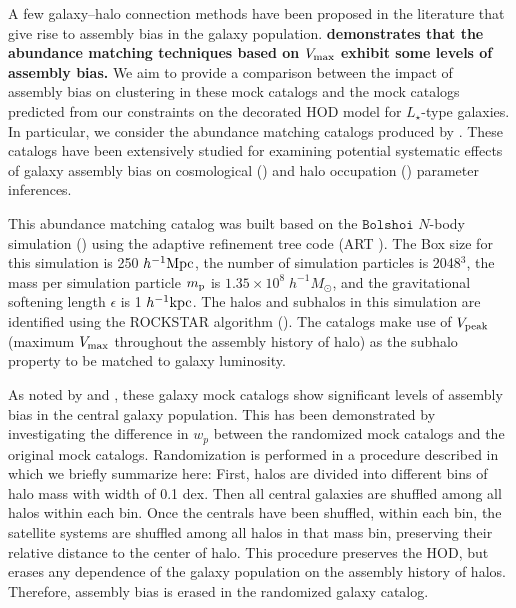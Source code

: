 \documentclass[twocolumn]{aastex61}
\begin{document}
A few galaxy--halo connection methods have been proposed in the literature that give rise to assembly bias in the galaxy population. 
{\bf \color{dred} 
    \citet{arz2014} demonstrates that the abundance matching techniques based on $V_{\rm max }$ 
    \citep{conroy:2006aa,hw2013,reddick2013} exhibit some levels of assembly bias. 
}
We aim to provide a comparison between the impact of assembly bias on clustering in these mock catalogs and the mock catalogs predicted from our constraints on the decorated HOD model for $L_{\star}$-type galaxies. In particular, we consider the abundance matching catalogs produced by \citet{hw2013}. These catalogs have been extensively studied for examining potential systematic effects of galaxy assembly bias on cosmological (\citealt{edHOD-weinberg}) and halo occupation (\citealt{arz2014}) parameter inferences. 

This abundance matching catalog was built based on the $\mathtt{Bolshoi}$ $N$-body simulation (\citealt{Klypin2011}) using the adaptive refinement tree code (ART \citealt{art}). The Box size for this simulation is 250 $h^{-1} \rm{Mpc}$, the number of simulation particles is 2048$^3$, the mass per simulation particle $m_{\rm p}$ is $1.35 \times 10^{8} \; h^{-1} M_{\odot}$, and the gravitational softening length $\epsilon$ is 1 $h^{-1} \rm{kpc}$. The halos and subhalos in this simulation are identified using the ROCKSTAR algorithm (\citealt{rockstar}). 
The \citealt{hw2013} catalogs make use of $V_{\rm peak}$ (maximum $V_{\rm max}$ throughout the assembly history of halo) as the subhalo property to be matched to galaxy luminosity. 

As noted by \citet{arz2014} and \citet{edHOD-weinberg}, these galaxy mock catalogs show significant levels of assembly bias in the central galaxy population. This has been demonstrated by investigating the difference in $w_{p}$ between the randomized mock catalogs and the original mock catalogs. Randomization is performed in a procedure described in \citet{arz2014} which we briefly summarize here: First, halos are divided into different bins of halo mass with width of 0.1 dex. Then all central galaxies are shuffled among all halos within each bin. Once the centrals have been shuffled, within each bin, the satellite systems are shuffled among all halos in that mass bin, preserving their relative distance to the center of halo. This procedure preserves the HOD, but erases any dependence of the galaxy population on the assembly history of halos. Therefore, assembly bias is erased in the randomized galaxy catalog. 
\end{document}
